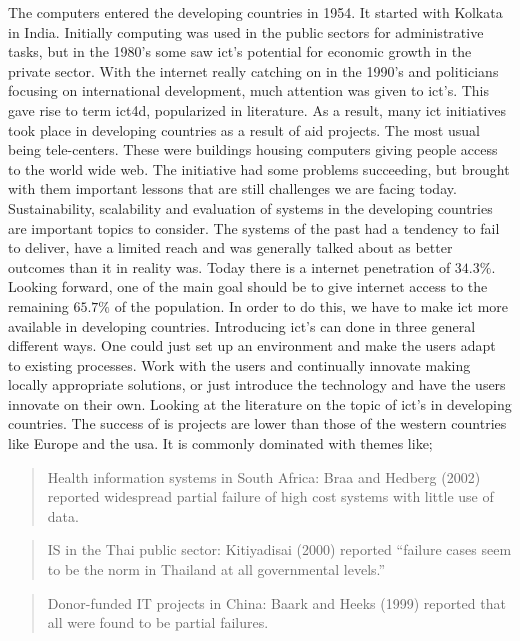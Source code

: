 The computers entered the developing countries in 1954. It started with Kolkata in India.
Initially computing was used in the public sectors for administrative tasks, but in the 1980's some saw \gls{ict}'s potential for economic growth in the private sector.
With the internet really catching on in the 1990's and politicians focusing on international development, much attention was given to \gls{ict}'s.
This gave rise to term \gls{ict4d}, popularized in literature.
As a result, many \gls{ict} initiatives took place in developing countries as a result of aid projects.
The most usual being tele-centers.
These were buildings housing computers giving people access to the world wide web.
The initiative had some problems succeeding, but brought with them important lessons that are still challenges we are facing today.
Sustainability, scalability and evaluation of systems in the developing countries are important topics to consider.
The systems of the past had a tendency to fail to deliver, have a limited reach and was generally talked about as better outcomes than it in reality was.
Today there is a internet penetration of $34.3\%$.
Looking forward, one of the main goal should be to give internet access to the remaining $65.7\%$ of the population.
In order to do this, we have to make \gls{ict} more available in developing countries.
Introducing \gls{ict}'s can done in three general different ways.
One could just set up an environment and make the users adapt to existing processes. 
Work with the users and continually innovate making locally appropriate solutions, or just introduce the technology and have the users innovate on their own. 
\cite{internet:stats}
\cite{icd4d:rh}
Looking at the literature on the topic of \gls{ict}'s in developing countries.
The success of \gls{is} projects are lower than those of the western countries like Europe and the \gls{usa}.
It is commonly dominated with themes like;
\begin{quotation}
Health information systems in South Africa: Braa
and Hedberg (2002) reported widespread partial
failure of high cost systems with little use of data.\cite{rh:isdc}
\end{quotation}

\begin{quotation}
IS in the Thai public sector: Kitiyadisai (2000)
reported “failure cases seem to be the norm in
Thailand at all governmental levels.”\cite{rh:isdc}
\end{quotation}

\begin{quotation}
Donor-funded IT projects in China: Baark and
Heeks (1999) reported that all were found to be
partial failures.\cite{rh:isdc}
\end{quotation}

